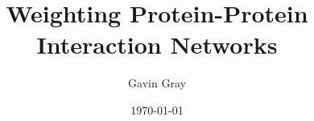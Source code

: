 \documentclass[12pt,oneside,abbrevs,dtc,mscres,neuro,notimes,logo]{styles/infthesis}
\title{Weighting Protein-Protein Interaction Networks}
\author{Gavin Gray}
\date{\today}
\begin{document}



  \begin{preliminary}
    \maketitle

    
    \standarddeclaration
    
    \tableofcontents
    \listoffigures
  \end{preliminary}

  
  
  
  
  

  \appendix

  
  
  
  

  \printbibliography
\end{document}
